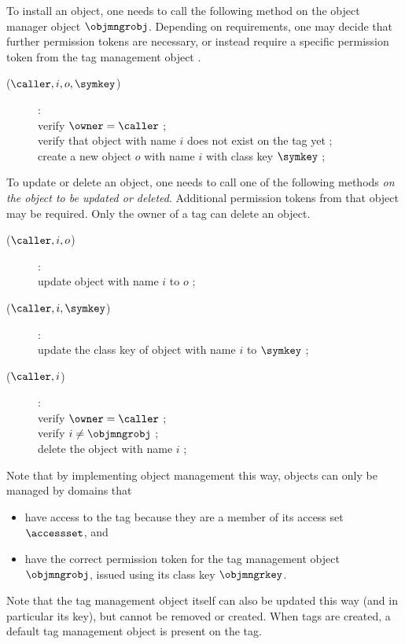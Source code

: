 To install an object, one needs to call the following method on the object
manager object $\objmngrobj$. Depending on requirements, one may decide that
further permission tokens are necessary, or instead require a specific
permission token from the tag management object .
\begin{description}
\item[($\caller,i,o,\symkey$)]:\\
	verify $\owner = \caller$ ; \\
	verify that object with name $i$ does not exist on the tag yet ; \\
	create a new object $o$ with name $i$ with class key $\symkey$ ;  
\end{description}
To update or delete an object, one needs to call one of the following methods
\emph{on the object to be updated or deleted}. Additional permission tokens 
from that
object may be required.
Only the owner of a tag can delete an object.
\begin{description}
\item[($\caller,i,o$)]:\\
	update object with name $i$ to $o$ ; 
\item[($\caller,i,\symkey$)]:\\
	update the class key of object with name $i$ to $\symkey$ ;  
\item[($\caller,i$)]:\\
	verify $\owner = \caller$ ; \\
	verify $i \neq \objmngrobj$ ; \\
	delete the object with name $i$ ; 
\end{description}


Note that by implementing object management this way, objects can only be
managed by domains that 
\begin{itemize}
\fixlistspacing
\item have access to the tag because they are a member of its access set
$\accessset$, and
\item have the correct permission token for the tag management object $\objmngrobj$,
issued using its class key $\objmngrkey$.
\end{itemize}
Note that the tag management object itself can also be updated this way (and in
particular its key), but cannot be removed or created.
When tags are created, a default tag management object is present on the tag.

